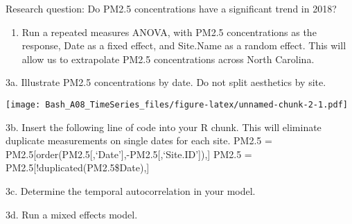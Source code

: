 \documentclass[]{article}
\newenvironment{Shaded}{\begin{snugshade}}{\end{snugshade}}
\newcommand{\KeywordTok}[1]{\textcolor[rgb]{0.13,0.29,0.53}{\textbf{#1}}}
\newcommand{\DataTypeTok}[1]{\textcolor[rgb]{0.13,0.29,0.53}{#1}}
\newcommand{\DecValTok}[1]{\textcolor[rgb]{0.00,0.00,0.81}{#1}}
\newcommand{\FloatTok}[1]{\textcolor[rgb]{0.00,0.00,0.81}{#1}}
\newcommand{\StringTok}[1]{\textcolor[rgb]{0.31,0.60,0.02}{#1}}
\newcommand{\CommentTok}[1]{\textcolor[rgb]{0.56,0.35,0.01}{\textit{#1}}}
\newcommand{\OperatorTok}[1]{\textcolor[rgb]{0.81,0.36,0.00}{\textbf{#1}}}
\newcommand{\NormalTok}[1]{#1}
\providecommand{\tightlist}{%
  \setlength{\itemsep}{0pt}\setlength{\parskip}{0pt}}
\begin{document}
Research question: Do PM2.5 concentrations have a significant trend in
2018?

\begin{enumerate}
\def\labelenumi{\arabic{enumi}.}
\setcounter{enumi}{2}
\tightlist
\item
  Run a repeated measures ANOVA, with PM2.5 concentrations as the
  response, Date as a fixed effect, and Site.Name as a random effect.
  This will allow us to extrapolate PM2.5 concentrations across North
  Carolina.
\end{enumerate}

3a. Illustrate PM2.5 concentrations by date. Do not split aesthetics by
site.

\begin{Shaded}
\end{Shaded}

\texttt{[image: Bash\_A08\_TimeSeries\_files/figure-latex/unnamed-chunk-2-1.pdf]}

3b. Insert the following line of code into your R chunk. This will
eliminate duplicate measurements on single dates for each site. PM2.5 =
PM2.5{[}order(PM2.5{[},`Date'{]},-PM2.5{[},`Site.ID'{]}),{]} PM2.5 =
PM2.5{[}!duplicated(PM2.5\$Date),{]}

3c. Determine the temporal autocorrelation in your model.

3d. Run a mixed effects model.
\end{document}
